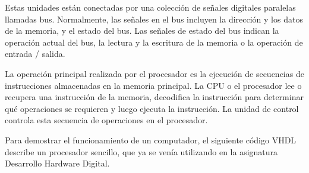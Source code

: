 Estas unidades están conectadas por una colección de señales digitales paralelas llamadas bus. Normalmente, 
las señales en el bus incluyen la dirección y los datos de la memoria, y el estado del bus. Las señales de estado del bus indican la operación actual 
del bus, la lectura y la escritura de la memoria o la operación de entrada / salida.

La operación principal realizada por el procesador es la ejecución de secuencias de instrucciones almacenadas en la memoria principal. 
La CPU o el procesador lee o recupera una instrucción de la memoria, decodifica la instrucción para determinar qué operaciones se requieren y 
luego ejecuta la instrucción. La unidad de control controla esta secuencia de operaciones en el procesador.

Para demostrar el funcionamiento de un computador, el siguiente código VHDL describe un procesador sencillo, que ya se venía 
utilizando en la asignatura Desarrollo Hardware Digital.

